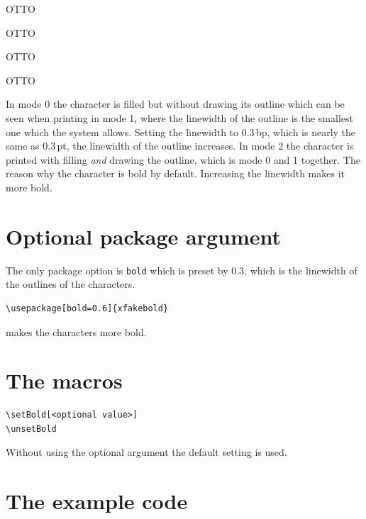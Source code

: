 \documentclass[english]{article}
\begin{document}
  OTTO\OFF\endtabular

  OTTO\OFF\endtabular

  OTTO\OFF\endtabular

  OTTO\OFF\endtabular
\fi

\bigskip
In mode 0 the character is filled but without drawing its outline which can be seen when printing in mode 1, where
the linewidth of the outline is the smallest one which the system allows. Setting the linewidth to 0.3\,bp, which is
nearly the same as 0.3\,pt, the linewidth of the outline increases. In mode 2 the character is printed with filling \emph{and}
drawing the outline, which is mode 0 and 1 together. The reason why the character is bold by default.  Increasing the linewidth 
makes it more bold.


\section{Optional package argument}
The only package option is \verb|bold| which is preset by 0.3, which is the linewidth of
the outlines of the characters.

\begin{lstlisting}
\usepackage[bold=0.6]{xfakebold}
\end{lstlisting}

makes the characters more bold.

\section{The macros}

\begin{lstlisting}
\setBold[<optional value>]
\unsetBold
\end{lstlisting}

Without using the optional argument the default setting is used.




\section{The example code}
\end{document}
